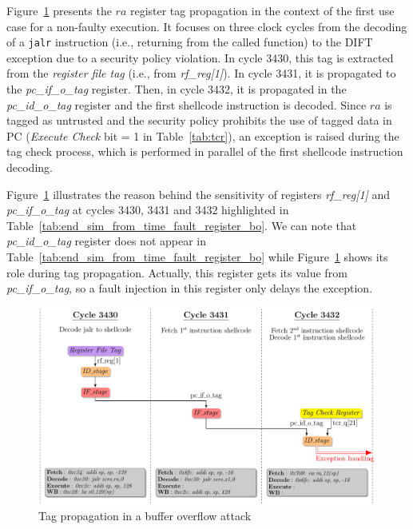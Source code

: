 Figure~\ref{fig:study_buffer_overflow_tag_propagation} presents the $ra$ register tag propagation in the context of the first use case for a non-faulty execution. It focuses on three clock cycles from the decoding of a \verb|jalr| instruction (i.e.,  returning from the called function) to the DIFT exception due to a security policy violation. 
In cycle 3430, this tag is extracted from the \textit{register file tag} (i.e., from \textit{rf\_reg[1]}). In cycle 3431, it is propagated to the \textit{pc\_if\_o\_tag} register. Then, in cycle 3432, it is propagated in the \textit{pc\_id\_o\_tag} register and the first shellcode instruction is decoded. Since $ra$ is tagged as untrusted and the security policy prohibits the use of tagged data in PC (\textit{Execute Check} bit = 1 in Table~\ref{tab:tcr}), an exception is raised during the tag check process, which is performed in parallel of the first shellcode instruction decoding.

Figure~\ref{fig:study_buffer_overflow_tag_propagation} illustrates the reason behind the sensitivity of registers \textit{rf\_reg[1]} and \textit{pc\_if\_o\_tag} at cycles 3430, 3431 and 3432 highlighted in  Table~\ref{tab:end_sim_from_time_fault_register_bo}. We can note that \textit{pc\_id\_o\_tag} register does not appear in Table~\ref{tab:end_sim_from_time_fault_register_bo} while Figure~\ref{fig:study_buffer_overflow_tag_propagation} shows its role during tag propagation. Actually, this register gets its value from \textit{pc\_if\_o\_tag}, so a fault injection in this register only delays the exception. 

\begin{figure}[ht]
    \centering
    \includegraphics[width=\textwidth]{c3_vulnerabilities_assessment/img/buffer_overflow/bufferOverflowAttack_short.pdf}
    \caption{Tag propagation in a buffer overflow attack}
    \label{fig:study_buffer_overflow_tag_propagation}
\end{figure}

